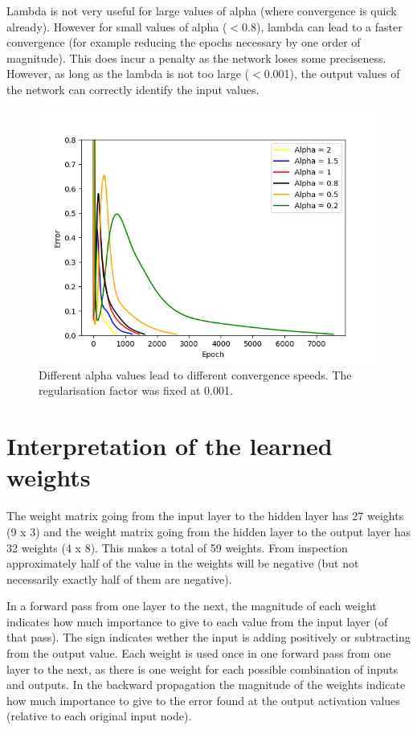 \documentclass[a4paper]{article}
\begin{document}
Lambda is not very useful for large values of alpha (where convergence is quick already). However for small values of alpha ($<$0.8), lambda can lead to a faster convergence (for example reducing the epochs necessary by one order of magnitude). This does incur a penalty as the network loses some preciseness. However, as long as the lambda is not too large ($<$0.001), the output values of the network can correctly identify the input values.

\begin{figure}
\includegraphics[scale=0.7]{learning_rate}
\caption{Different alpha values lead to different convergence speeds. The regularisation factor was fixed at 0.001.}
\end{figure}


\section{Interpretation of the learned weights}

The weight matrix going from the input layer to the hidden layer has 27 weights (9 x 3) and the weight matrix going from the hidden layer to the output layer has 32 weights (4 x 8). This makes a total of 59 weights. From inspection approximately half of the value in the weights will be negative (but not necessarily exactly half of them are negative).

In a forward pass from one layer to the next, the magnitude of each weight indicates how much importance to give to each value from the input layer (of that pass). The sign indicates wether the input is adding positively or subtracting from the output value. Each weight is used once in one forward pass from one layer to the next, as there is one weight for each possible combination of inputs and outputs. In the backward propagation the magnitude of the weights indicate how much importance to give to the error found at the output activation values (relative to each original input node). 
\end{document}
